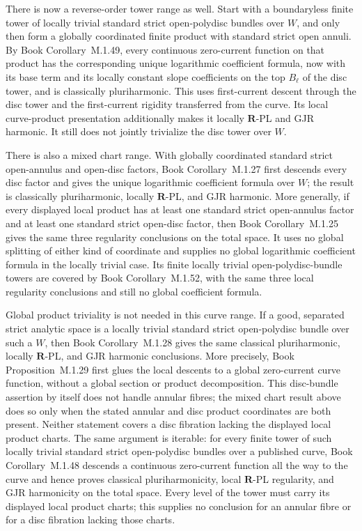 \documentclass[11pt,a4paper]{article}
\theoremstyle{definition}
\theoremstyle{remark}
\begin{document}
There is now a reverse-order tower range as well.  Start with a
boundaryless finite tower of locally trivial standard strict open-polydisc
bundles over \(W\), and only then form a globally coordinated finite product
with standard strict open annuli.  By
Book Corollary~M.1.49, every
continuous zero-current function on that product has the corresponding
unique logarithmic coefficient formula, now with its base term and its
locally constant slope coefficients on the top \(B_\ell\) of the disc
tower, and is classically pluriharmonic.  This uses first-current descent
through the disc tower and the first-current rigidity transferred from the
curve.  Its local curve-product presentation additionally makes it locally
\(\mathbf R\)-PL and GJR harmonic.  It still does not jointly trivialize
the disc tower over \(W\).

There is also a mixed chart range.  With globally coordinated standard
strict open-annulus and open-disc factors,
Book Corollary~M.1.27 first descends every
disc factor and gives the unique logarithmic coefficient formula over \(W\);
the result is classically pluriharmonic, locally \(\mathbf R\)-PL, and GJR
harmonic.  More generally, if every displayed local product has at least one
standard strict open-annulus factor and at least one standard strict
open-disc factor, then
Book Corollary~M.1.25 gives the same
three regularity conclusions on the total space.  It uses no global splitting
of either kind of coordinate and supplies no global logarithmic coefficient
formula in the locally trivial case.  Its finite locally trivial
open-polydisc-bundle towers are covered by
Book Corollary~M.1.52, with
the same three local regularity conclusions and still no global coefficient
formula.

Global product triviality is not needed in this curve range.  If a good,
separated strict analytic space is a locally trivial standard strict
open-polydisc bundle over such a \(W\), then
Book Corollary~M.1.28 gives the same classical
pluriharmonic, locally \(\mathbf R\)-PL, and GJR harmonic conclusions.  More precisely,
Book Proposition~M.1.29 first glues the local descents
to a global zero-current curve function, without a global section or product
decomposition.  This disc-bundle assertion by itself does not handle annular
fibres; the mixed chart result above does so only when the stated annular
and disc product coordinates are both present.  Neither statement covers a
disc fibration lacking the displayed local product charts.
The same argument is iterable: for every finite tower of such locally
trivial standard strict open-polydisc bundles over a published curve,
Book Corollary~M.1.48 descends a
continuous zero-current function all the way to the curve and hence proves
classical pluriharmonicity, local \(\mathbf R\)-PL regularity, and GJR
harmonicity on the total space.  Every level of the tower must carry its
displayed local product charts; this supplies no conclusion for an annular
fibre or for a disc fibration lacking those charts.
\end{document}
